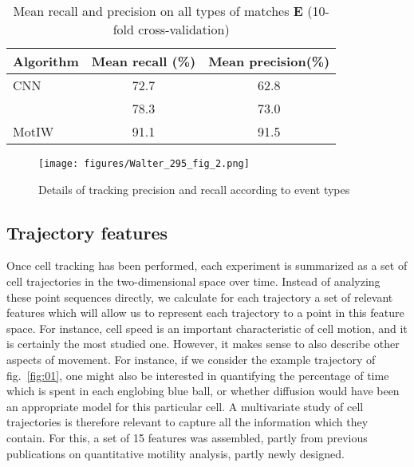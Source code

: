 \begin{table}[!ht]
\centering
\caption{Mean recall and precision on all types of matches $\mathbf{E}$ (10-fold cross-validation)\label{accuracy}}{
\begin{tabular}{l|c|c}
Algorithm & Mean recall (\%) & Mean precision(\%)\\
\hline
CNN & 72.7 & 62.8 \\
\cite{jaqaman} & 78.3 & 73.0 \\
MotIW  & 91.1 & 91.5 \\
\end{tabular}}

\end{table}
\begin{figure}[ht]
\centerline{\texttt{[image: figures/Walter\_295\_fig\_2.png]}}
\caption{Details of tracking precision and recall according to event types}
\label{details}
\end{figure}



\subsection{Trajectory features}
\label{sec:features}
Once cell tracking has been performed, each experiment is summarized
as a set of cell trajectories in the two-dimensional space over
time. Instead of analyzing these point sequences directly, we
calculate for each trajectory a set of relevant features which will allow us to
represent each trajectory to a point in this feature space. 
For instance, cell speed is an important characteristic of cell motion, and it
is certainly the most studied one. However, it makes sense to also
describe other aspects of movement. For instance, if we consider the example
trajectory of fig.~\ref{fig:01}, one might also be interested in
quantifying the percentage of time which is spent in each englobing
blue ball, or whether diffusion would have been an appropriate model
for this particular cell. A multivariate study of cell trajectories is
therefore relevant to capture all the information which they
contain. For this, a set of 15 features was assembled, partly from previous
publications on quantitative motility analysis, partly newly
designed. 

